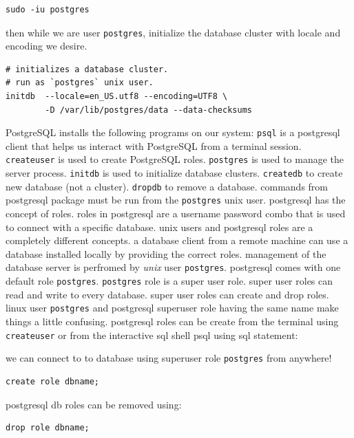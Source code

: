 \documentclass[a4paper]{article}
\begin{document}
\begin{lstlisting}
sudo -iu postgres
\end{lstlisting}


then while we are user \lstinline{postgres}, initialize the database cluster with locale and encoding we desire.

\begin{lstlisting}
# initializes a database cluster.
# run as `postgres` unix user.
initdb  --locale=en_US.utf8 --encoding=UTF8 \
        -D /var/lib/postgres/data --data-checksums
\end{lstlisting}

PostgreSQL installs the following programs on our system: \lstinline{psql} is a postgresql client that helps us interact 
with PostgreSQL from a terminal session. \lstinline{createuser} is used to create PostgreSQL roles. \lstinline{postgres} is
used to manage the server process. \lstinline{initdb} is used to initialize database clusters. \lstinline{createdb} to create new
database (not a cluster). \lstinline{dropdb} to remove a database. commands from postgresql package must be run from the 
\lstinline{postgres} unix user. postgresql has the concept of roles. roles in postgresql are a username password combo that is
used to connect with a specific database. unix users and postgresql roles are a completely different concepts. a database client
from a remote machine can use a database installed locally by providing the correct roles. management of the database server is 
perfromed by \emph{unix} user \lstinline{postgres}. postgresql comes with one default role \lstinline{postgres}. \lstinline{postgres}
role is a super user role. super user roles can read and write to every database. super user roles can create and drop roles.
linux user \lstinline{postgres} and postgresql superuser role having the same name make things a little confusing. postgresql roles can
be create from the terminal using \lstinline{createuser} or from the interactive sql shell psql using sql statement:

we can connect to to database using superuser role \lstinline{postgres} from anywhere!

\lstset{style=custom-sql}
\begin{lstlisting}
create role dbname;
\end{lstlisting}

postgresql db roles can be removed using:

\begin{lstlisting}
drop role dbname;
\end{lstlisting}
\end{document}
